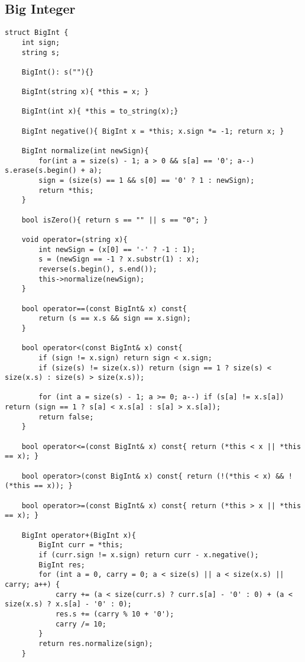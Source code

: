 \documentclass[12pt,a4paper,onesided]{article}
\begin{document}
\begin{multicols}{3}
\subsection{Big Integer}
\begin{lstlisting}
struct BigInt {
    int sign;
    string s;

    BigInt(): s(""){}

    BigInt(string x){ *this = x; }

    BigInt(int x){ *this = to_string(x);}

    BigInt negative(){ BigInt x = *this; x.sign *= -1; return x; }

    BigInt normalize(int newSign){
        for(int a = size(s) - 1; a > 0 && s[a] == '0'; a--) s.erase(s.begin() + a);
        sign = (size(s) == 1 && s[0] == '0' ? 1 : newSign);
        return *this;
    }

    bool isZero(){ return s == "" || s == "0"; }

    void operator=(string x){
        int newSign = (x[0] == '-' ? -1 : 1);
        s = (newSign == -1 ? x.substr(1) : x);
        reverse(s.begin(), s.end());
        this->normalize(newSign);
    }

    bool operator==(const BigInt& x) const{
        return (s == x.s && sign == x.sign);
    }

    bool operator<(const BigInt& x) const{
        if (sign != x.sign) return sign < x.sign;
        if (size(s) != size(x.s)) return (sign == 1 ? size(s) < size(x.s) : size(s) > size(x.s));

        for (int a = size(s) - 1; a >= 0; a--) if (s[a] != x.s[a]) return (sign == 1 ? s[a] < x.s[a] : s[a] > x.s[a]);
        return false;
    }

    bool operator<=(const BigInt& x) const{ return (*this < x || *this == x); }

    bool operator>(const BigInt& x) const{ return (!(*this < x) && !(*this == x)); }

    bool operator>=(const BigInt& x) const{ return (*this > x || *this == x); }

    BigInt operator+(BigInt x){
        BigInt curr = *this;
        if (curr.sign != x.sign) return curr - x.negative();
        BigInt res;
        for (int a = 0, carry = 0; a < size(s) || a < size(x.s) || carry; a++) {
            carry += (a < size(curr.s) ? curr.s[a] - '0' : 0) + (a < size(x.s) ? x.s[a] - '0' : 0);
            res.s += (carry % 10 + '0');
            carry /= 10;
        }
        return res.normalize(sign);
    }


\end{lstlisting}
\end{multicols}
\end{document}
